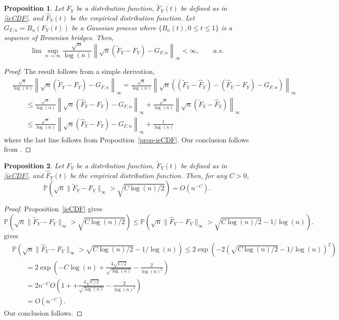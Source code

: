 \documentclass[11pt]{article}
\newcommand{\Prob}{\mathbb{P}}
\newtheorem{prop}{Proposition}
\begin{document}
\begin{prop}
Let $F_Y$ be a distribution function, $\widetilde F_Y(t)$ be defined as in \eqref{ieCDF}, and $\widehat F_Y(t)$ be the empirical distribution function. Let $G_{F,n} = B_n(F_Y(t))$ be a Gaussian process where $\{B_n(t), 0 \leq t \leq 1\}$ is a sequence of Brownian bridges. Then,
$$
  \lim\sup_{n\to\infty} \frac{\sqrt{n}}{\log(n)}
    \left\|\sqrt{n}(\widetilde F_Y - F_Y) - G_{F,n}\right\|_\infty
    < \infty, \qquad a.s.
$$
\end{prop}

\begin{proof}
The result follows from a simple derivation,
\begin{align*}
  &\frac{\sqrt{n}}{\log(n)} \left\|\sqrt{n}(\widetilde F_Y - F_Y) - G_{F,n}\right\|_\infty
    = \frac{\sqrt{n}}{\log(n)} 
      \left\|
        \sqrt{n}((\widetilde F_Y - \widehat F_Y) - ( \widehat F_Y - F_Y) - G_{F,n})
      \right\|_\infty \\
    &\qquad\leq \frac{\sqrt{n}}{\log(n)}
      \left\| \sqrt{n}(\widehat F_Y - F_Y) - G_{F,n}\right\|_\infty 
      + \frac{\sqrt{n}}{\log(n)} 
        \left\| \sqrt{n}(\widetilde F_Y - \widehat F_Y)\right\|_\infty \\
    &\qquad\leq \frac{\sqrt{n}}{\log(n)}
      \left\| \sqrt{n}(\widehat F_Y - F_Y) - G_{F,n}\right\|_\infty 
      + \frac{1}{\log(n)}         
\end{align*}
where the last line follows from Proposition~\ref{prop-ieCDF}. Our conclusion follows from \cite{komlos1975approximation}.
\end{proof}


\begin{prop}
Let $F_Y$ be a distribution function, $\widetilde F_Y(t)$ be defined as in \eqref{ieCDF}, and $\widehat F_Y(t)$ be the empirical distribution function. Then, for any $C > 0$, 
$$
  \Prob\left(\sqrt{n}\|\widetilde F_Y - F_Y\|_\infty > \sqrt{C\log(n)/2}\right) = O\left(n^{-C}\right).
$$
\end{prop}

\begin{proof}
Proposition~\ref{ieCDF} gives
$$
  \Prob\left(\sqrt{n}\|\widetilde F_Y - F_Y\|_\infty > \sqrt{C\log(n)/2}\right) 
    \leq \Prob\left(\sqrt{n}\|\widehat F_Y - F_Y\|_\infty > \sqrt{C\log(n)/2} - 1/\log(n)\right).
$$
\cite{massart1990tight} gives 
\begin{align*}
  &\Prob\left(\sqrt{n}\|\widehat F_Y - F_Y\|_\infty > \sqrt{C\log(n)/2} - 1/\log(n)\right)
    \leq 2\exp\left( -2(\sqrt{C\log(n)/2} - 1/\log(n))^2\right) \\
  &\qquad= 2\exp\left(-C\log(n) + \frac{4\sqrt{C/2}}{\sqrt{\log(n)}} - \frac{2}{\log(n)^2}\right) \\
  &\qquad= 2n^{-C}
    O\left(1 + + \frac{4\sqrt{C/2}}{\sqrt{\log(n)}} - \frac{2}{\log(n)^2}\right) \\
  &\qquad = O\left(n^{-C}\right).
\end{align*}
Our conclusion follows.
\end{proof}




\end{document}
